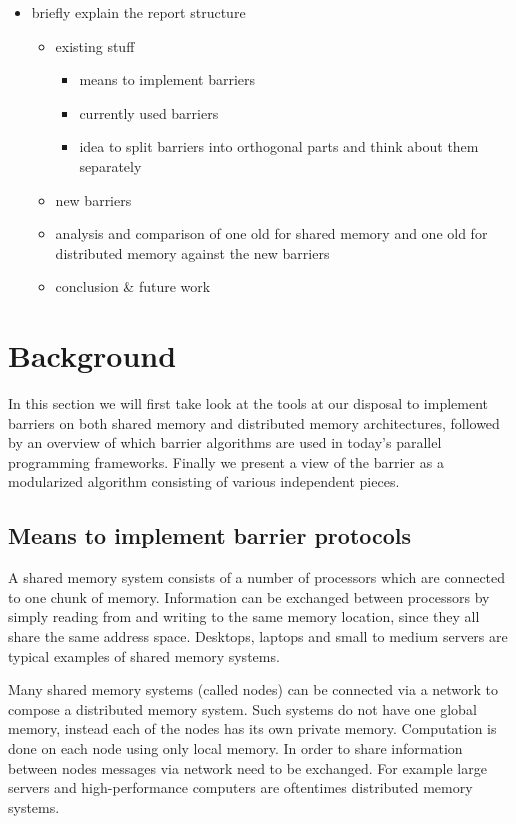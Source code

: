 \documentclass[a4paper, 10pt]{article}
\begin{document}
\begin{itemize}
\begin{itemize}
		\end{itemize}
	\item briefly explain the report structure
		\begin{itemize}
			\item existing stuff
				\begin{itemize}
					\item means to implement barriers
					\item currently used barriers
					\item idea to split barriers into orthogonal parts and think about them separately
				\end{itemize}
			\item new barriers
			\item analysis and comparison of one old for shared memory and one old for distributed memory against the new barriers
			\item conclusion \& future work
		\end{itemize}
\end{itemize}

\section{Background}
\label{sec:background}
In this section we will first take look at the tools at our disposal to implement barriers on both shared memory and distributed memory architectures, followed by an overview of which barrier algorithms are used in today's parallel programming frameworks.
Finally we present a view of the barrier as a modularized algorithm consisting of various independent pieces.

\subsection{Means to implement barrier protocols}
\label{ssec:background-means}
A shared memory system consists of a number of processors which are connected to one chunk of memory. Information can be exchanged between processors by simply reading from and writing to the same memory location, since they all share the same address space.
Desktops, laptops and small to medium servers are typical examples of shared memory systems.

Many shared memory systems (called nodes) can be connected via a network to compose a distributed memory system. Such systems do not have one global memory, instead each of the nodes has its own private memory. Computation is done on each node using only local memory. In order to share information between nodes messages via network need to be exchanged.
For example large servers and high-performance computers are oftentimes distributed memory systems.
\end{document}
